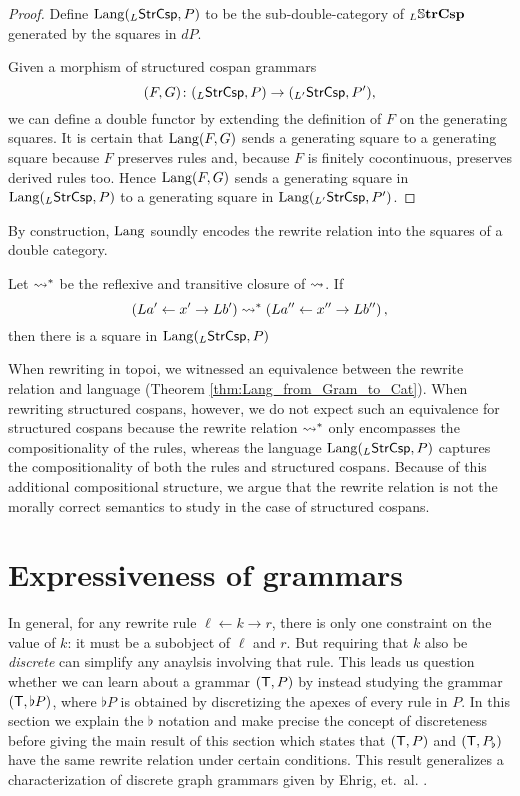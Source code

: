 \documentclass{amsart}
\begin{document}
\begin{proof}
  Define $\mathrm{Lang} (_L\mathsf{StrCsp},P)$ to be the
  sub-double-category of $_L\mathbb{S} \mathbf{trCsp}$ generated
  by the squares in $dP$.
  
  Given a morphism of structured cospan grammars
  $$(F,G) \colon (_L\mathsf{StrCsp},P) \to (_{L'}\mathsf{StrCsp},P'),$$ we
  can define a double functor by extending the definition of
  $F$ on the generating squares. It is certain that
  $\mathrm{Lang} (F,G)$ sends a generating square to a generating
  square because $F$ preserves rules and, because $F$ is
  finitely cocontinuous, preserves derived rules too.  Hence
  $\mathrm{Lang} (F,G)$ sends a generating square in
  $\mathrm{Lang} (_{L}\mathsf{StrCsp},P)$ to a generating square in
  $\mathrm{Lang} (_{L'}\mathsf{StrCsp},P')$.
\end{proof}

By construction, $ \mathrm{Lang} $ soundly
encodes the rewrite relation into the squares of a
double category.

\begin{corollary}
  \label{thm:StrCspLang_Encodes_RewrRel}
  Let $ \rightsquigarrow^\ast $ be the reflexive and
  transitive closure of $ \rightsquigarrow $.  If
  $$ \left(La' \leftarrow x' \to Lb'\right) \rightsquigarrow^\ast \left(La'' \leftarrow x'' \to Lb''\right), $$ then there is a square
   in
  $ \mathrm{Lang} ({}_L\mathsf{StrCsp}, P) $
\end{corollary}

When rewriting in topoi, we witnessed an
equivalence between the rewrite relation and
language (Theorem
\ref{thm:Lang_from_Gram_to_Cat}). When rewriting
structured cospans, however, we do not expect such
an equivalence for structured cospans because the
rewrite relation $ \rightsquigarrow^\ast $ only encompasses
the compositionality of the rules, whereas the
language $ \mathrm{Lang} (_L\mathsf{StrCsp},P) $ captures the
compositionality of both the rules and structured
cospans. Because of this additional compositional
structure, we argue that the rewrite relation is
not the morally correct semantics to study in the
case of structured cospans. 

\section{Expressiveness of grammars}
\label{sec:gen-result-graph-rewriting}

In general, for any rewrite rule
$ \ell \gets k \to r $, there is only one
constraint on the value of $ k $: it must be a
subobject of $ \ell $ and $ r $.  But requiring
that $ k $ also be \emph{discrete} can simplify
any anaylsis involving that rule. This leads us
question whether we can learn about a grammar
$ ( \mathsf{T},P ) $ by instead studying the grammar
$ ( \mathsf{T}, \flat P ) $, where $ \flat P $ is obtained
by discretizing the apexes of every rule in $ P
$. In this section we explain the $ \flat $
notation and make precise the concept of
discreteness before giving the main result of this
section which states that $ ( \mathsf{T},P ) $ and
$ ( \mathsf{T}, P_\flat  ) $ have the same rewrite relation
under certain conditions.  This result generalizes
a characterization of discrete graph grammars
given by Ehrig,
et.~al. \cite[Prop.~3.3]{Ehrig_GraphGram}.
\end{document}
